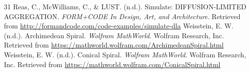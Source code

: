 \documentclass[sigconf]{nimeart}
\begin{document}
\begin{thebibliography}{31}
 {{ }}  Reas, C., McWilliams, C., \& LUST. (n.d.). Simulate: DIFFUSION-LIMITED AGGREGATION. \emph{FORM+CODE In Design, Art, and Architecture}. Retrieved from \url{http://formandcode.com/code-examples/simulate-dla}{}
 {{ }}  Weisstein, E. W. (n.d.). Archimedean Spiral. \emph{Wolfram MathWorld}. Wolfram Research, Inc. Retrieved from \url{https://mathworld.wolfram.com/ArchimedeanSpiral.html}{}
 {{ }}  Weisstein, E. W. (n.d.). Conical Spiral. \emph{Wolfram MathWorld}. Wolfram Research, Inc. Retrieved from \url{https://mathworld.wolfram.com/ConicalSpiral.html}{}
\end{thebibliography}
\end{document}
